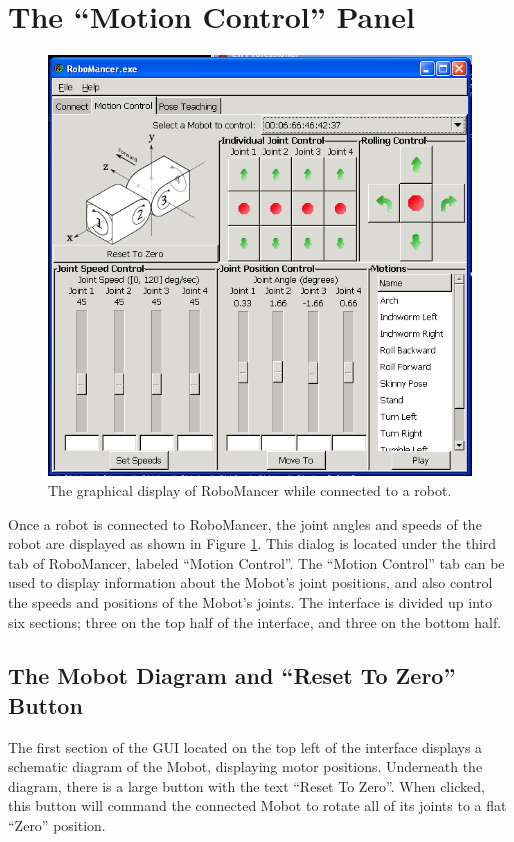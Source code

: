 \documentclass{article}
\begin{document}
\section{ The ``Motion Control'' Panel}
\begin{figure}[H]
\begin{center}
\includegraphics[width=4.5in]{images/robomancer_screenshot5.png}
\end{center}
\caption{\label{fig:shot1_populated.png} The graphical display of RoboMancer
while connected to a robot.}
\end{figure}

Once a robot is connected to RoboMancer, the joint angles and speeds
of the robot are displayed as shown in Figure \ref{fig:shot1_populated.png}.
This dialog is located under the third tab of RoboMancer, labeled 
``Motion Control''.
The ``Motion Control'' tab can be
used to display
information about the Mobot's joint positions, and also control the
speeds and positions of the Mobot's joints. The interface is divided
up into six sections; three on the top half of the interface, and three on 
the bottom half. 

\subsection{The Mobot Diagram and ``Reset To Zero'' Button}
The first section of the GUI located on the top left of the interface
displays a schematic diagram of the Mobot, displaying motor positions.
Underneath the diagram, there is a large button with the text 
``Reset To Zero''. When clicked, this button will command the connected
Mobot to rotate all of its joints to a flat ``Zero'' position.
\end{document}
